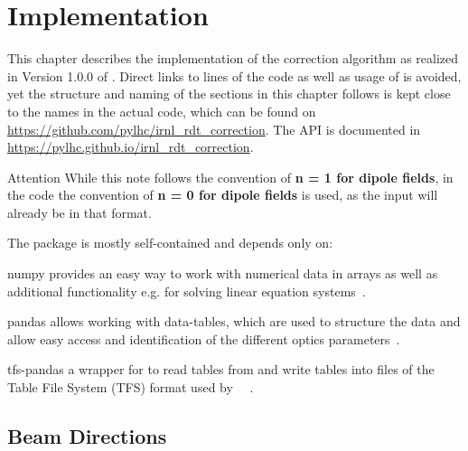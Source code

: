 \section{Implementation}
This chapter describes the implementation of the correction algorithm as 
realized in Version 1.0.0 of \cite{OMC-TeamIRNLRDTCorrection}.
Direct links to lines of the code as well as usage of  is avoided,
yet the structure and naming of the sections in this chapter follows is kept close to the names in the actual code,
which can be found on
\href{https://github.com/pylhc/irnl_rdt_correction}{https://github.com/pylhc/irnl\_rdt\_correction}.
The API is documented in  
\href{https://pylhc.github.io/irnl_rdt_correction}{https://pylhc.github.io/irnl\_rdt\_correction}.

\begin{important}
        \item[\color{CernRed} Attention] While this note follows the convention of \textbf{n = 1 for dipole fields}, 
        in the code the  convention of \textbf{n = 0 for dipole fields}  is used, as the input will already be in that format.
\end{important}


The package is mostly self-contained and depends only on:

\begin{options}
        \item[numpy]
        provides an easy way to work with numerical data in arrays as well as additional functionality 
        e.g. for solving linear equation systems~\cite{HarrisArrayProgrammingNumPy2020}.
        \item[pandas]
        allows working with data-tables, which are used to structure the data and allow easy access and identification 
        of the different optics parameters~\cite{pandas}.
        \item[tfs-pandas]
        a wrapper for  to read tables from  and write tables into files of 
        the Table File System (TFS) format used by ~\cite{CERNMadX}~\cite{OMC-TeamTFSPandas}.
\end{options}


\subsection{Beam Directions}
\label{sec:BeamDirection}

